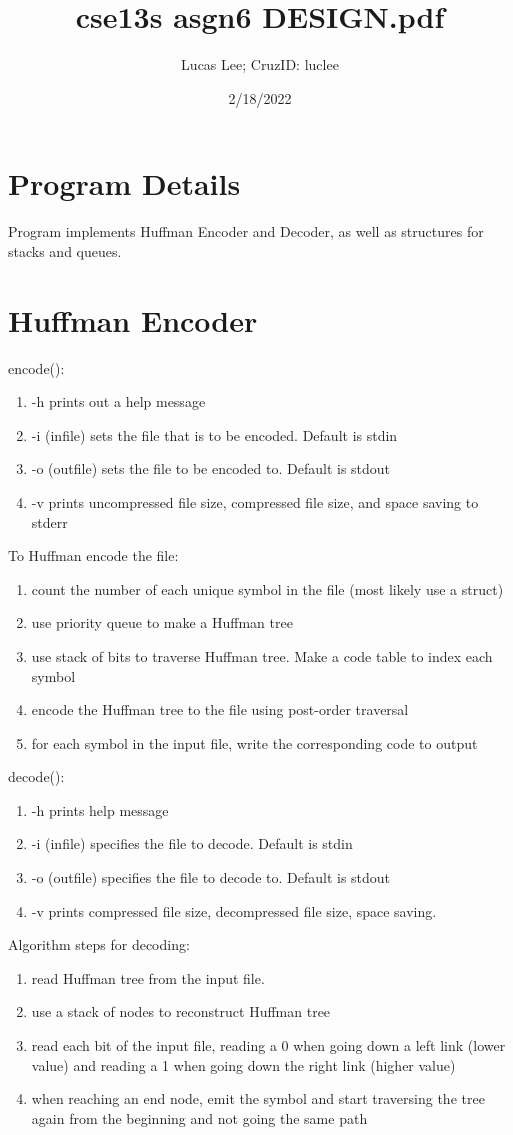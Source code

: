 \documentclass[11pt]{article}
\title{cse13s asgn6 DESIGN.pdf}
\author{Lucas Lee; CruzID: luclee}
\date{2/18/2022}
\begin{document}
\maketitle
\section{Program Details}\label{ss:details}
Program implements Huffman Encoder and Decoder, as well as structures for stacks and queues.
\section{Huffman Encoder}\label{ss:encoder}
encode():
\begin{enumerate}
\item -h prints out a help message
\item -i (infile) sets the file that is to be encoded. Default is stdin
\item -o (outfile) sets the file to be encoded to. Default is stdout
\item -v prints uncompressed file size, compressed file size, and space saving to stderr
\end{enumerate}
To Huffman encode the file:
\begin{enumerate}
\item count the number of each unique symbol in the file (most likely use a struct)
\item use priority queue to make a Huffman tree
\item use stack of bits to traverse Huffman tree. Make a code table to index each symbol 
\item encode the Huffman tree to the file using post-order traversal
\item for each symbol in the input file, write the corresponding code to output
\end{enumerate}
decode():
\begin{enumerate}
\item -h prints help message
\item -i (infile) specifies the file to decode. Default is stdin
\item -o (outfile) specifies the file to decode to. Default is stdout
\item -v prints compressed file size, decompressed file size, space saving.
\end{enumerate}
Algorithm steps for decoding:
\begin{enumerate}
\item read Huffman tree from the input file.
\item use a stack of nodes to reconstruct Huffman tree
\item read each bit of the input file, reading a 0 when going down a left link (lower value) and reading a 1 when going down the right link (higher value)
\item when reaching an end node, emit the symbol and start traversing the tree again from the beginning and not going the same path
\end{enumerate}
\end{document}
